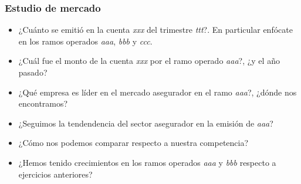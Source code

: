 \begin{frame}
    \frametitle{Estudio de mercado}
    \begin{itemize}
        \item<1-> ¿Cuánto se emitió en la cuenta \textit{xxx} del trimestre \textit{ttt}?. En particular enfócate en los ramos operados \textit{aaa}, \textit{bbb} y \textit{ccc}.
        \item<2-> ¿Cuál fue el monto de la cuenta \textit{xxx} por el ramo operado \textit{aaa}?, ¿y el año pasado?
        \item<3-> ¿Qué empresa es líder en el mercado asegurador en el ramo \textit{aaa}?, ¿dónde nos encontramos?
        \item<4-> ¿Seguimos la tendendencia del sector asegurador en la emisión de \textit{aaa}?
        \item<5-> ¿Cómo nos podemos comparar respecto a nuestra competencia?
        \item<6-> ¿Hemos tenido crecimientos en los ramos operados \textit{aaa} y \textit{bbb} respecto a ejercicios anteriores?
  \end{itemize}
\end{frame}